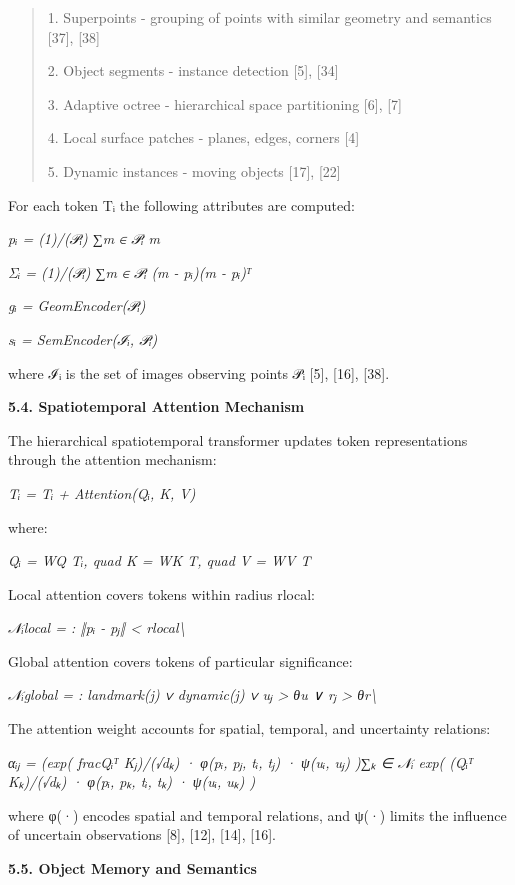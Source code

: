 \documentclass[
]{article}
\begin{document}
\begin{quote}
1. Superpoints - grouping of points with similar geometry and semantics
{[}37{]}, {[}38{]}

2. Object segments - instance detection {[}5{]}, {[}34{]}

3. Adaptive octree - hierarchical space partitioning {[}6{]}, {[}7{]}

4. Local surface patches - planes, edges, corners {[}4{]}

5. Dynamic instances - moving objects {[}17{]}, {[}22{]}
\end{quote}

For each token Tᵢ the following attributes are computed:

\emph{pᵢ = (1)/(\textbar 𝒫ᵢ\textbar) ∑m ∈ 𝒫ᵢ m}

\emph{Σᵢ = (1)/(\textbar 𝒫ᵢ\textbar) ∑m ∈ 𝒫ᵢ (m - pᵢ)(m - pᵢ)ᵀ}

\emph{gᵢ = GeomEncoder(𝒫ᵢ)}

\emph{sᵢ = SemEncoder(ℐᵢ, 𝒫ᵢ)}

where ℐᵢ is the set of images observing points 𝒫ᵢ {[}5{]}, {[}16{]},
{[}38{]}.

\textbf{5.4. Spatiotemporal Attention Mechanism}

The hierarchical spatiotemporal transformer updates token
representations through the attention mechanism:

\emph{Tᵢ\textquotesingle{} = Tᵢ + Attention(Qᵢ, K, V)}

where:

\emph{Qᵢ = WQ Tᵢ, quad K = WK T, quad V = WV T}

Local attention covers tokens within radius rlocal:

\emph{𝒩ᵢlocal = : ‖pᵢ - pⱼ‖ \textless{} rlocal\textbackslash{}}

Global attention covers tokens of particular significance:

\emph{𝒩ᵢglobal = : landmark(j) ∨ dynamic(j) ∨ uⱼ \textgreater{} θu ∨ rⱼ
\textgreater{} θr\textbackslash{}}

The attention weight accounts for spatial, temporal, and uncertainty
relations:

\emph{αᵢⱼ = (exp( fracQᵢᵀ Kⱼ)/(√dₖ) · φ(pᵢ, pⱼ, tᵢ, tⱼ) · ψ(uᵢ, uⱼ) )∑ₖ
∈ 𝒩ᵢ exp( (Qᵢᵀ Kₖ)/(√dₖ) · φ(pᵢ, pₖ, tᵢ, tₖ) · ψ(uᵢ, uₖ) )}

where φ(·) encodes spatial and temporal relations, and ψ(·) limits the
influence of uncertain observations {[}8{]}, {[}12{]}, {[}14{]},
{[}16{]}.

\textbf{5.5. Object Memory and Semantics}
\end{document}
